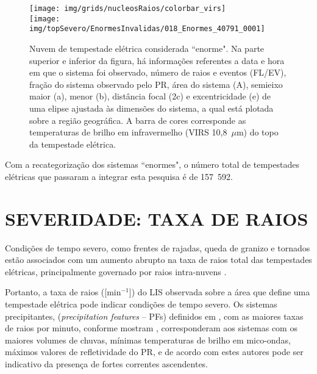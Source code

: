 \begin{figure}[hb]
\centering
\texttt{[image: img/grids/nucleosRaios/colorbar\_virs]}\\
\texttt{[image: img/topSevero/EnormesInvalidas/018\_Enormes\_40791\_0001]}
\caption{Nuvem de tempestade elétrica considerada ``enorme". Na parte superior e inferior da figura, há informações referentes a data e hora em que o sistema foi observado, número de raios e eventos (FL/EV), fração do sistema observado pelo PR, área do sistema (A), semieixo maior (a), menor (b), distância focal (2c) e excentricidade (e) de uma elipse ajustada às dimensões do sistema, a qual está plotada sobre a região geográfica. A barra de cores corresponde as temperaturas de brilho em infravermelho (VIRS 10,8~$\mu$m) do topo da tempestade elétrica.}  
\label{nuvem221}
\end{figure}

Com a recategorização dos sistemas ``enormes", o número total de tempestades elétricas que passaram a integrar esta pesquisa é de 157~592.



\section{SEVERIDADE: TAXA DE RAIOS}
\label{metodoFtaFt}

Condições de tempo severo, como frentes de rajadas, queda de granizo e tornados estão associados com um aumento abrupto na taxa de raios total das tempestades elétricas, principalmente governado por raios intra-nuvens \cite{macgorman1989, carey1998, williams1999, gatlin2010, schultz2011}.   

Portanto, a taxa de raios ([min$^{-1}$]) do LIS observada sobre a área que define uma tempestade elétrica pode indicar condições de tempo severo. Os sistemas precipitantes, (\textit{precipitation features} -- PFs) definidos em , com as maiores 
taxas de raios por minuto, conforme mostram  , corresponderam aos sistemas com os maiores volumes de chuvas, mínimas temperaturas de brilho em mico-ondas, máximos valores de refletividade do PR, e de acordo com estes autores pode ser indicativo da presença de fortes correntes ascendentes. 

